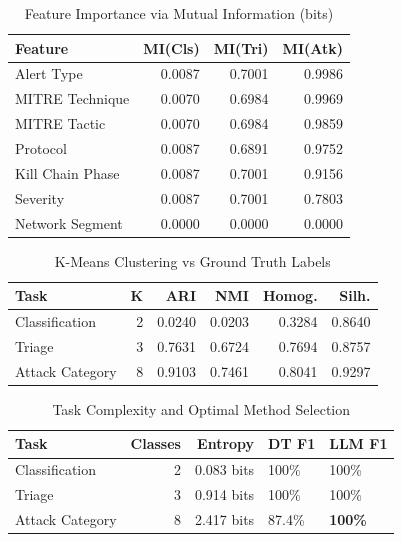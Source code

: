 \documentclass{article}
\begin{document}
\begin{table}[t]
\centering
\caption{Feature Importance via Mutual Information (bits)}
\label{tab:feature_importance}
\begin{tabular}{lrrr}
\toprule
\textbf{Feature} & \textbf{MI(Cls)} & \textbf{MI(Tri)} & \textbf{MI(Atk)} \\
\midrule
Alert Type & 0.0087 & 0.7001 & 0.9986 \\
MITRE Technique & 0.0070 & 0.6984 & 0.9969 \\
MITRE Tactic & 0.0070 & 0.6984 & 0.9859 \\
Protocol & 0.0087 & 0.6891 & 0.9752 \\
Kill Chain Phase & 0.0087 & 0.7001 & 0.9156 \\
Severity & 0.0087 & 0.7001 & 0.7803 \\
Network Segment & 0.0000 & 0.0000 & 0.0000 \\
\bottomrule
\end{tabular}
\end{table}

\begin{table}[t]
\centering
\caption{K-Means Clustering vs Ground Truth Labels}
\label{tab:clustering}
\begin{tabular}{lrrrrr}
\toprule
\textbf{Task} & \textbf{K} & \textbf{ARI} & \textbf{NMI} & \textbf{Homog.} & \textbf{Silh.} \\
\midrule
Classification & 2 & 0.0240 & 0.0203 & 0.3284 & 0.8640 \\
Triage & 3 & 0.7631 & 0.6724 & 0.7694 & 0.8757 \\
Attack Category & 8 & 0.9103 & 0.7461 & 0.8041 & 0.9297 \\
\bottomrule
\end{tabular}
\end{table}

\begin{table}[t]
\centering
\caption{Task Complexity and Optimal Method Selection}
\label{tab:task_complexity}
\begin{tabular}{lrrll}
\toprule
\textbf{Task} & \textbf{Classes} & \textbf{Entropy} & \textbf{DT F1} & \textbf{LLM F1} \\
\midrule
Classification & 2 & 0.083 bits & 100\% & 100\% \\
Triage & 3 & 0.914 bits & 100\% & 100\% \\
Attack Category & 8 & 2.417 bits & 87.4\% & \textbf{100\%} \\
\bottomrule
\end{tabular}
\end{table}
\end{document}

